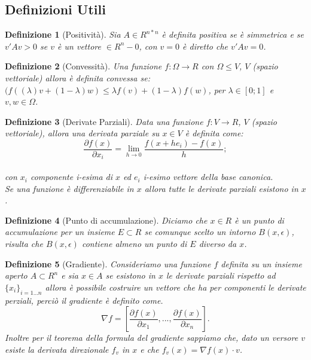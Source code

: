 \documentclass[a4paper, 12pt]{article}
\newtheorem{definition}{Definizione}
\begin{document}
\subsection{Definizioni Utili}
\begin{definition}[Positività]
Sia $A \in R^{n*n}$ è definita positiva se è simmetrica e se $v'Av > 0$ se $v$ è un vettore $\in R^n - {0}$, con $v = 0$ è diretto che $v'Av = 0$.
\end{definition}
\begin{definition}[Convessità]
Una funzione $f:\Omega \to R$ con $\Omega \leq V$, $V$ (spazio vettoriale) allora è definita convessa se: $(f((\lambda)v + (1 - \lambda)w) \leq \lambda f(v) + (1 - \lambda)f(w)$, per $\lambda \in [0;1]$ e $v, w \in \Omega$.
\end{definition}
\begin{definition}[Derivate Parziali]
Data una funzione $f:V \to R$, $V$ (spazio vettoriale), allora una derivata parziale su $x \in V$ è definita come:\\
\[\frac{\partial f(x)}{\partial x_i} = \lim_{h \to 0} \frac{f(x + h e_i) - f(x)}{h};\]\\ 
con $x_i$ componente i-esima di $x$ ed $e_i$ i-esimo vettore della base canonica.\\
Se una funzione è differenziabile in $x$ allora tutte le derivate parziali esistono in $x$.
\end{definition}
\begin{definition}[Punto di accumulazione]
Diciamo che $x \in R$ è un punto di accumulazione per un insieme $E \subset R$ se comunque scelto un intorno $B(x, \epsilon)$, risulta che $B(x, \epsilon)$ contiene almeno un punto di $E$ diverso da $x$.
\end{definition}
\begin{definition}[Gradiente]
Consideriamo una funzione $f$ definita su un insieme aperto $A \subset R^n$ e sia $x \in A$ se esistono in $x$ le derivate parziali rispetto ad $\{x_i\}_{i=1...n}$ allora è possibile costruire un vettore che ha per componenti le derivate perziali, perciò il gradiente è definito come.\\
\[\nabla f = [\frac{\partial f(x)}{\partial x_1}, ..., \frac{\partial f(x)}{\partial x_n}].\]
Inoltre per il teorema della formula del gradiente sappiamo che, dato un versore $v$ esiste la derivata direzionale $f_v$ in $x$ e che $f_v(x) = \nabla f(x) \cdot v$.
\end{definition}
\end{document}
